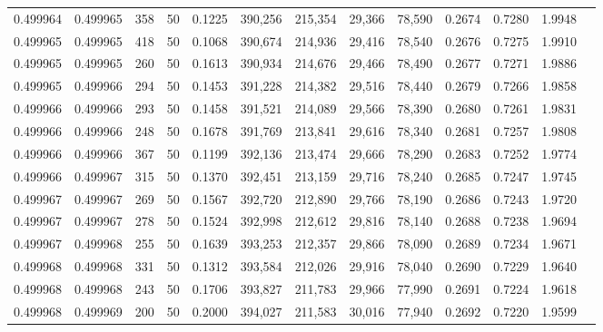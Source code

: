 \begin{tabular}{rrrrrrrrrrrrr}
0.499964 & 0.499965 &   358 &  50 &                                     0.1225 & 390,256 & 215,354 &  29,366 &  78,590 & 0.2674 & 0.7280 & 1.9948 \\
0.499965 & 0.499965 &   418 &  50 &                                     0.1068 & 390,674 & 214,936 &  29,416 &  78,540 & 0.2676 & 0.7275 & 1.9910 \\
0.499965 & 0.499965 &   260 &  50 &                                     0.1613 & 390,934 & 214,676 &  29,466 &  78,490 & 0.2677 & 0.7271 & 1.9886 \\
0.499965 & 0.499966 &   294 &  50 &                                     0.1453 & 391,228 & 214,382 &  29,516 &  78,440 & 0.2679 & 0.7266 & 1.9858 \\
0.499966 & 0.499966 &   293 &  50 &                                     0.1458 & 391,521 & 214,089 &  29,566 &  78,390 & 0.2680 & 0.7261 & 1.9831 \\
0.499966 & 0.499966 &   248 &  50 &                                     0.1678 & 391,769 & 213,841 &  29,616 &  78,340 & 0.2681 & 0.7257 & 1.9808 \\
0.499966 & 0.499966 &   367 &  50 &                                     0.1199 & 392,136 & 213,474 &  29,666 &  78,290 & 0.2683 & 0.7252 & 1.9774 \\
0.499966 & 0.499967 &   315 &  50 &                                     0.1370 & 392,451 & 213,159 &  29,716 &  78,240 & 0.2685 & 0.7247 & 1.9745 \\
0.499967 & 0.499967 &   269 &  50 &                                     0.1567 & 392,720 & 212,890 &  29,766 &  78,190 & 0.2686 & 0.7243 & 1.9720 \\
0.499967 & 0.499967 &   278 &  50 &                                     0.1524 & 392,998 & 212,612 &  29,816 &  78,140 & 0.2688 & 0.7238 & 1.9694 \\
0.499967 & 0.499968 &   255 &  50 &                                     0.1639 & 393,253 & 212,357 &  29,866 &  78,090 & 0.2689 & 0.7234 & 1.9671 \\
0.499968 & 0.499968 &   331 &  50 &                                     0.1312 & 393,584 & 212,026 &  29,916 &  78,040 & 0.2690 & 0.7229 & 1.9640 \\
0.499968 & 0.499968 &   243 &  50 &                                     0.1706 & 393,827 & 211,783 &  29,966 &  77,990 & 0.2691 & 0.7224 & 1.9618 \\
0.499968 & 0.499969 &   200 &  50 &                                     0.2000 & 394,027 & 211,583 &  30,016 &  77,940 & 0.2692 & 0.7220 & 1.9599 \\

\end{tabular}
